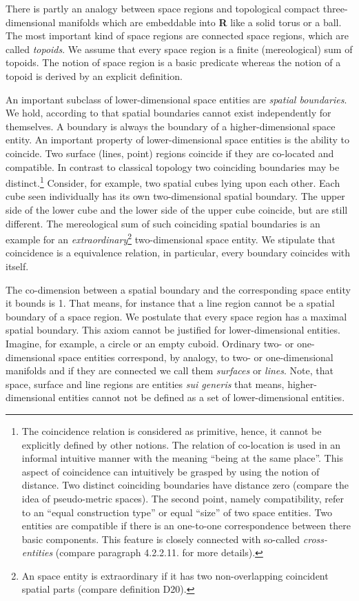 \documentclass{ao2e}
\begin{document}
{There is partly an analogy between space regions and topological compact three-dimensional manifolds which are embeddable into \textbf{R} like a solid torus or a ball. The most important kind of space regions are
connected space regions, which are called \textit{topoids}. We assume that every space region is a
finite (mereological) sum of topoids. 
The notion of space region is a basic predicate whereas the notion of a topoid is derived by an 
explicit definition.

An important subclass of lower-dimensional space entities are \textit{spatial boundaries}. We hold, according to \cite{brentano-f-1976-a} that spatial boundaries cannot exist independently for themselves. A boundary is always the boundary of a higher-dimensional space entity. An important property of lower-dimensional space entities is the ability to coincide. Two surface (lines, point) regions coincide if they are co-located and compatible. In contrast to classical topology two coinciding boundaries may be distinct.\footnote{The coincidence relation  is considered as primitive, hence, it cannot be explicitly defined by other notions. The relation of co-location is used in an informal intuitive manner with the meaning ``being at the same place''. This aspect of coincidence can intuitively be grasped by using the notion of distance. Two distinct coinciding boundaries have distance zero (compare the idea of pseudo-metric spaces). The second point, namely compatibility, refer to an ``equal construction type'' or equal ``size'' of two space entities. Two entities are compatible if there is an one-to-one correspondence between there basic components. This feature is closely connected with so-called \textit{cross-entities} (compare paragraph 4.2.2.11. for more details).}  Consider, for example, two spatial cubes lying upon each other. Each cube seen individually has its own two-dimensional spatial boundary. The upper side of the lower cube and the lower side of the upper cube coincide, but are still different. The mereological sum of such coinciding spatial boundaries is an example for an \textit{extraordinary}\footnote{An space entity is extraordinary if it has two non-overlapping coincident spatial parts (compare definition D20).} two-dimensional space entity. We stipulate that coincidence is a equivalence relation, in particular, every boundary coincides with itself.
  
The co-dimension between a spatial boundary and the corresponding space entity it bounds is 1. That means, for instance that a line region cannot be a spatial boundary of a space region. We postulate that every space region has a maximal
spatial boundary. This axiom cannot be justified for lower-dimensional entities. Imagine, for example,  a circle or an empty cuboid. Ordinary two- or one-dimensional space entities correspond, by analogy, to two- or one-dimensional manifolds and if they are connected we call them
\textit{surfaces} or \textit{lines}. Note,  that space, surface and line regions are entities \textit{sui generis} that means, higher-dimensional entities cannot not be defined as a set of lower-dimensional entities.

}
\end{document}
